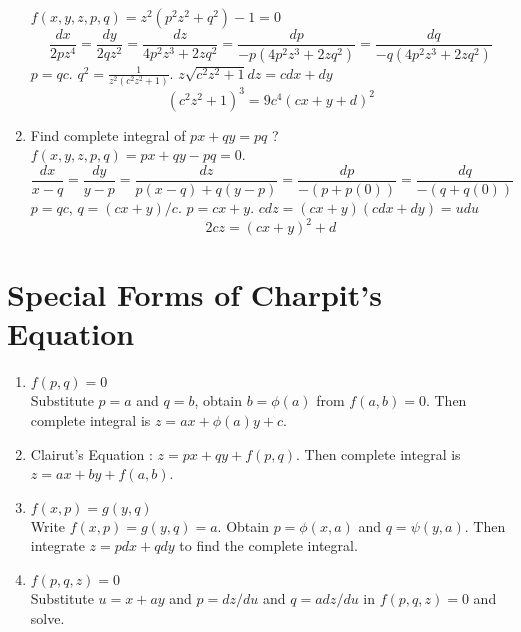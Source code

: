 \begin{enumerate}
	$f(x,y,z,p,q) = z^2(p^2z^2+q^2)-1 = 0$
		$$\frac{dx}{2pz^4} = \frac{dy}{2qz^2} = \frac{dz}{4p^2z^3+2zq^2} = \frac{dp}{-p(4p^2z^3+2zq^2)} = \frac{dq}{-q(4p^2z^3+2zq^2)}$$
		$p = qc$. $q^2 = \frac{1}{z^2(c^2z^2+1)}$. $z\sqrt{c^2z^2+1}dz = c dx + dy$
		$$(c^2z^2+1)^3  = 9c^4(cx + y + d)^2$$
	\item Find complete integral of $px + qy = pq$ ?\\
	$f(x,y,z,p,q) = px + qy - pq = 0$.
		$$\frac{dx}{x-q} = \frac{dy}{y-p} = \frac{dz}{p(x-q)+q(y-p)} = \frac{dp}{-(p+p(0))} = \frac{dq}{-(q+q(0))}$$
		$p = qc$, $q = (cx+y)/c$. $p = cx+y$. $cdz = (cx+y)(cdx + dy) = udu$
		$$2cz = (cx+y)^2 + d$$
\end{enumerate}

\section{Special Forms of Charpit's Equation}
\begin{enumerate}
	\item $f(p,q) = 0$ \\
	Substitute $p = a$ and $q = b$, obtain $b = \phi(a)$ from $f(a,b) = 0$. Then complete integral is $z = ax + \phi(a)y + c$.
	\item Clairut's Equation : $z = px + qy + f(p,q)$. Then complete integral is $z = ax + by + f(a,b)$.
	\item $f(x,p) = g(y,q)$\\
	Write $f(x,p) = g(y,q) = a$. Obtain $p = \phi(x,a)$ and $q = \psi(y,a)$. Then integrate $z = pdx + qdy$ to find the complete integral.
	\item $f(p,q,z) = 0$ \\
	Substitute $u = x+ay$ and $p = dz/du$ and $q = adz/du$ in $f(p,q,z) = 0$ and solve.
\end{enumerate}

